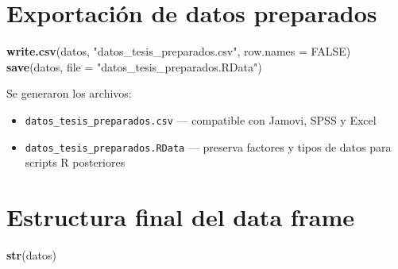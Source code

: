 \documentclass[
  spanish,
]{article}
\newenvironment{Shaded}{\begin{snugshade}}{\end{snugshade}}
\newcommand{\AttributeTok}[1]{\textcolor[rgb]{0.13,0.29,0.53}{#1}}
\newcommand{\ConstantTok}[1]{\textcolor[rgb]{0.56,0.35,0.01}{#1}}
\newcommand{\FunctionTok}[1]{\textcolor[rgb]{0.13,0.29,0.53}{\textbf{#1}}}
\newcommand{\NormalTok}[1]{#1}
\newcommand{\StringTok}[1]{\textcolor[rgb]{0.31,0.60,0.02}{#1}}
\begin{document}
\section{Exportación de datos
preparados}\label{exportaciuxf3n-de-datos-preparados}

\begin{Shaded}
\begin{Highlighting}[]
\FunctionTok{write.csv}\NormalTok{(datos, }\StringTok{"datos\_tesis\_preparados.csv"}\NormalTok{, }\AttributeTok{row.names =} \ConstantTok{FALSE}\NormalTok{)}
\FunctionTok{save}\NormalTok{(datos, }\AttributeTok{file =} \StringTok{"datos\_tesis\_preparados.RData"}\NormalTok{)}
\end{Highlighting}
\end{Shaded}

Se generaron los archivos:

\begin{itemize}
  \item \texttt{datos\_tesis\_preparados.csv} --- compatible con Jamovi, SPSS y Excel
  \item \texttt{datos\_tesis\_preparados.RData} --- preserva factores y tipos de datos para scripts R posteriores
\end{itemize}

\section{Estructura final del data
frame}\label{estructura-final-del-data-frame}

\begin{Shaded}
\begin{Highlighting}[]
\FunctionTok{str}\NormalTok{(datos)}
\end{Highlighting}
\end{Shaded}
\end{document}
